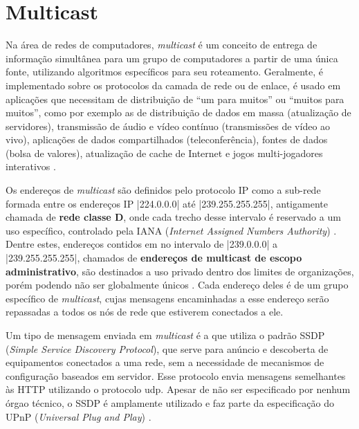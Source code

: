 
\newpage
\section{Multicast}

\begin{comment}
Apesar de não ser utilizado pelo protocolo BitTorrent, o multicast, que é uma forma de
entregar dados a um grupo de computadores simultaneamente numa só transmissão, é usado
pelo Transmission para tentar descobrir \glspl*{peer} que estão na mesma rede local,
otimizando as conexões.
\end{comment}

Na área de redes de computadores, \emph{multicast} é um conceito de entrega de
informação simultânea para um grupo de computadores a partir de uma única fonte,
utilizando algoritmos específicos para seu roteamento. Geralmente, é implementado sobre
os protocolos da camada de rede ou de enlace, é usado em aplicações que necessitam de
distribuição de ``um para muitos'' ou ``muitos para muitos'', como por exemplo as de
distribuição de dados em massa (atualização de servidores), transmissão de áudio e vídeo
contínuo (transmissões de vídeo ao vivo), aplicações de dados compartilhados
(teleconferência), fontes de dados (bolsa de valores), atualização de cache de Internet
e jogos multi-jogadores interativos \cite{book:kurose}.

Os endereços de \emph{multicast} são definidos pelo protocolo IP como a sub-rede formada
entre os endereços IP \sverb|224.0.0.0| até \sverb|239.255.255.255|, antigamente chamada
de \textbf{rede classe D}, onde cada trecho desse intervalo é reservado a um uso
específico, controlado pela IANA (\emph{Internet Assigned Numbers Authority})
\cite{site:iana-multicast}. Dentre estes, endereços contidos em no intervalo de
\sverb|239.0.0.0| a \sverb|239.255.255.255|, chamados de
\textbf{endereços de multicast de escopo administrativo}, são destinados a uso privado
dentro dos limites de organizações, porém podendo não ser globalmente únicos
\cite{site:rfcmulticast}. Cada endereço deles é de um grupo específico de
\emph{multicast}, cujas mensagens encaminhadas a esse endereço serão repassadas a todos
os nós de rede que estiverem conectados a ele.

Um tipo de mensagem enviada em \emph{multicast} é a que utiliza o padrão SSDP
(\emph{Simple Service Discovery Protocol}), que serve para anúncio e descoberta de
equipamentos conectados a uma rede, sem a necessidade de mecanismos de configuração
baseados em servidor. Esse protocolo envia mensagens semelhantes às HTTP utilizando o
protocolo \gls{udp}. Apesar de não ser especificado por nenhum órgao técnico, o SSDP é
amplamente utilizado e faz parte da especificação do UPnP
(\emph{Universal Plug and Play}) \cite{site:upnp}.

